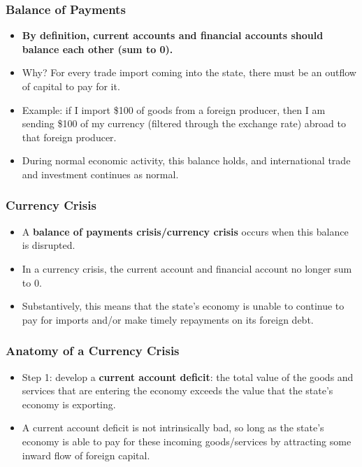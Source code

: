 \documentclass{beamer}
\begin{document}
\begin{frame} 
	\frametitle{\LARGE{Balance of Payments}}
	\begin{itemize}
		\item \textbf{By definition, current accounts and financial accounts should balance each other (sum to 0).} \pause
		\item Why? For every trade import coming into the state, there must be an outflow of capital to pay for it. \pause
		\item Example: if I import \$100 of goods from a foreign producer, then I am sending \$100 of my currency (filtered through the exchange rate) abroad to that foreign producer. \pause
		\item During normal economic activity, this balance holds, and international trade and investment continues as normal. 
	\end{itemize}
\end{frame}

\begin{frame} 
	\frametitle{\LARGE{Currency Crisis}}
	\begin{itemize}
		\item A \textbf{balance of payments crisis/currency crisis} occurs when this balance is disrupted. \pause
		\item In a currency crisis, the current account and financial account no longer sum to 0. \pause
		\item Substantively, this means that the state's economy is unable to continue to pay for imports and/or make timely repayments on its foreign debt. 
	\end{itemize}
\end{frame}

\begin{frame} 
	\frametitle{\LARGE{Anatomy of a Currency Crisis}}
	\begin{itemize}
		\item Step 1: develop a \textbf{current account deficit}: the total value of the goods and services that are entering the economy exceeds the value that the state's economy is exporting. \pause
		\item A current account deficit is not intrinsically bad, so long as the state's economy is able to pay for these incoming goods/services by attracting some inward flow of foreign capital.
	\end{itemize}
\end{frame}
\end{document}

